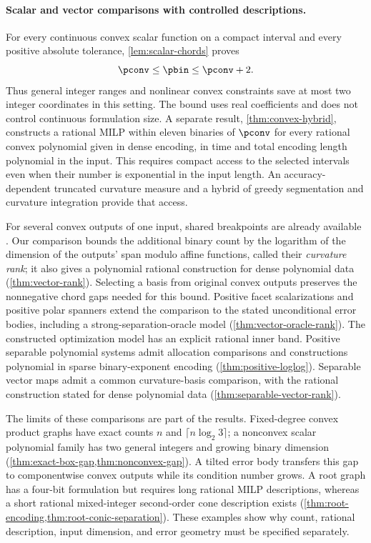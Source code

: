 \paragraph{Scalar and vector comparisons with controlled descriptions.}
For every continuous convex scalar function on a compact interval and
every positive absolute tolerance, \cref{lem:scalar-chords} proves
\[
 \pconv\le\pbin\le\pconv+2.
\]
Thus general integer ranges and nonlinear convex constraints save at most
two integer coordinates in this setting. The bound uses real coefficients
and does not control continuous formulation size. A separate result,
\cref{thm:convex-hybrid}, constructs a rational MILP within eleven binaries
of $\pconv$ for every rational convex polynomial given in dense encoding,
in time and total encoding length polynomial in the input. This requires
compact access to the selected intervals even when their number is
exponential in the input length. An accuracy-dependent truncated curvature
measure and a hybrid of greedy segmentation and curvature integration
provide that access.

For several convex outputs of one input, shared breakpoints are already
available \citep{lyu2026}. Our comparison bounds the additional binary
count by the logarithm of the dimension of the outputs' span modulo affine
functions, called their \emph{curvature rank}; it also gives a polynomial
rational construction for dense polynomial data
(\cref{thm:vector-rank}). Selecting a basis from original convex outputs
preserves the nonnegative chord gaps needed for this bound. Positive facet
scalarizations and positive polar spanners extend the comparison to the
stated unconditional error bodies, including a strong-separation-oracle
model (\cref{thm:vector-oracle-rank}). The constructed optimization model
has an explicit rational inner band. Positive separable polynomial systems
admit allocation comparisons and constructions polynomial in sparse
binary-exponent encoding (\cref{thm:positive-loglog}). Separable vector
maps admit a common curvature-basis comparison, with the rational
construction stated for dense polynomial data
(\cref{thm:separable-vector-rank}).

The limits of these comparisons are part of the results. Fixed-degree
convex product graphs have exact counts $n$ and $\lceil n\log_2 3\rceil$;
a nonconvex scalar polynomial family has two general integers and growing
binary dimension (\cref{thm:exact-box-gap,thm:nonconvex-gap}). A tilted
error body transfers this gap to componentwise convex outputs while its
condition number grows. A root graph has a four-bit formulation but
requires long rational MILP descriptions, whereas a short rational
mixed-integer second-order cone description exists
(\cref{thm:root-encoding,thm:root-conic-separation}). These examples show why
count, rational description, input dimension, and error geometry must be
specified separately.

